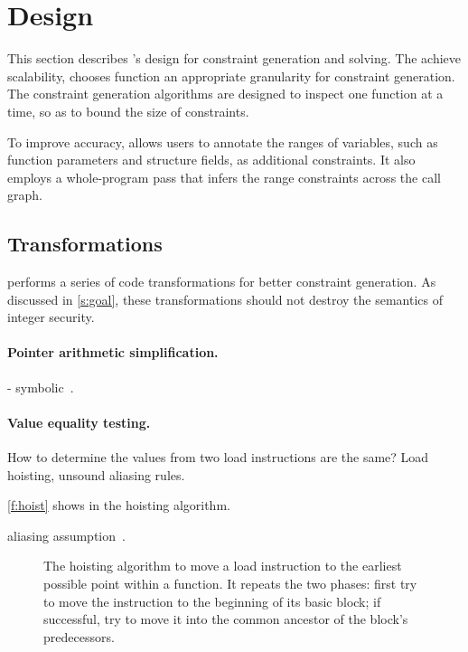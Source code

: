\section{Design}
\label{s:gen}

This section describes \sys's design for constraint generation and
solving.  The achieve scalability, \sys chooses function an appropriate
granularity for constraint generation.  The constraint generation
algorithms are designed to inspect one function at a time, so as
to bound the size of constraints.

To improve accuracy, \sys allows users to annotate the ranges of
variables, such as function parameters and structure fields, as
additional constraints. It also employs a whole-program pass that
infers the range constraints across the call graph.

\subsection{Transformations}

\sys performs a series of code transformations for better constraint
generation.  As discussed in \autoref{s:goal}, these transformations
should not destroy the semantics of integer security.

\paragraph{Pointer arithmetic simplification.}
- symbolic~\cite{engelen:symbolic}.

\paragraph{Value equality testing.}
How to determine the values from two load instructions
are the same? Load hoisting, unsound aliasing rules.

\autoref{f:hoist} shows in the hoisting algorithm.

aliasing assumption~\cite{livshits:ipssa}.

\begin{figure}
\footnotesize

\caption{The hoisting algorithm to move a load instruction to the
earliest possible point within a function.  It repeats the two
phases: first try to move the instruction to the beginning of its
basic block; if successful, try to move it into the common ancestor
of the block's predecessors.}
\label{f:hoist}
\end{figure}

